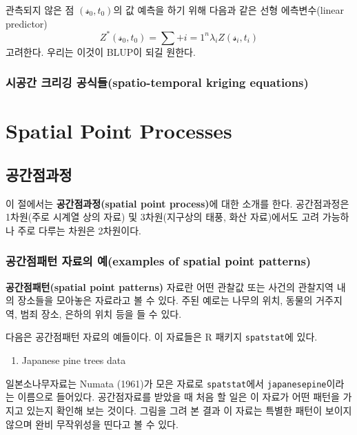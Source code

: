 \documentclass[b5paper,]{book}
\providecommand{\tightlist}{%
  \setlength{\itemsep}{0pt}\setlength{\parskip}{0pt}}
\theoremstyle{definition}
\theoremstyle{definition}
\theoremstyle{definition}
\theoremstyle{remark}
\begin{document}
관측되지 않은 점 \((\mathcal{s}_{0},t_{0})\)의 값 예측을 하기 위해
다음과 같은 선형 에측변수(linear predictor)
\[Z^{*}(\mathcal{s}_{0},t_{0})=\sum+{i=1}^{n}\lambda_{i}Z(\mathcal{s}_{i}, t_{i})\]
고려한다. 우리는 이것이 BLUP이 되길 원한다.

\section{시공간 크리깅 공식들(spatio-temporal kriging
equations)}\label{--spatio-temporal-kriging-equations}

\part{Spatial Point
Processes}\label{part-spatial-point-processes}

\chapter{공간점과정}\label{pointpattern}

이 절에서는 \textbf{공간점과정(spatial point process)}에 대한 소개를
한다. 공간점과정은 1차원(주로 시계열 상의 자료) 및 3차원(지구상의 태풍,
화산 자료)에서도 고려 가능하나 주로 다루는 차원은 2차원이다.

\section{공간점패턴 자료의 예(examples of spatial point
patterns)}\label{--examples-of-spatial-point-patterns}

\textbf{공간점패턴(spatial point patterns)} 자료란 어떤 관찰값 또는
사건의 관찰지역 내의 장소들을 모아놓은 자료라고 볼 수 있다. 주된 예로는
나무의 위치, 동물의 거주지역, 범죄 장소, 은하의 위치 등을 들 수 있다.

다음은 공간점패턴 자료의 예들이다. 이 자료들은 R 패키지
\texttt{spatstat}에 있다.

\begin{enumerate}
\def\labelenumi{\arabic{enumi}.}
\tightlist
\item
  Japanese pine trees data
\end{enumerate}

일본소나무자료는 Numata (1961)가 모은 자료로 \texttt{spatstat}에서
\texttt{japanesepine}이라는 이름으로 들어있다. 공간점자료를 받았을 때
처음 할 일은 이 자료가 어떤 패턴을 가지고 있는지 확인해 보는 것이다.
그림을 그려 본 결과 이 자료는 특별한 패턴이 보이지 않으며 완비
무작위성을 띤다고 볼 수 있다.
\end{document}
